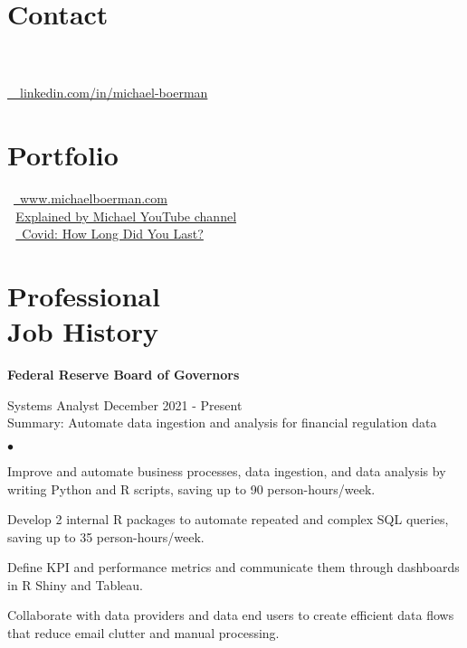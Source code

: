 \documentclass[margin, line]{res}
\newenvironment{list2}{
  \begin{list}{$\bullet$}{%
      \setlength{\itemsep}{0.04in}
      \setlength{\parsep}{0in} \setlength{\parskip}{0in}
      \setlength{\topsep}{0.05in} \setlength{\partopsep}{0in} 
      \setlength{\leftmargin}{\dimexpr 26pt-0.05in}}}
    {\end{list}}
\begin{document}

\begin{resume}

\vspace{-1mm}
\section{\sc Contact }

 \\
 \\
\faLinkedinIn  \href{https://www.linkedin.com/in/michael-boerman}{\ttfamily \, \, linkedin.com/in/michael-boerman}\\
\vspace{-.65cm}


\section{\sc Portfolio }
\faBriefcase \, \href{https://www.michaelboerman.com/}{\ttfamily  \, www.michaelboerman.com}\\
 \,\, \href{https://www.youtube.com/channel/UCxFMrMb6PrS7SOrQi-BfMUw/videos?view=0&sort=p&flow=grid}{ Explained by Michael YouTube channel}\\
\faChartLine \,\, \href{https://michaelboerman.shinyapps.io/covid_percentiles/}{\, Covid: How Long Did You Last?}\\
\vspace{-.35cm}


\section{\sc Professional \\ Job History }
{\bf Federal Reserve Board of Governors}\\

\vspace{-.65cm}

Systems Analyst \hfill December 2021 - Present\\
\hspace*{3mm} 
    Summary: Automate data ingestion and analysis for financial regulation data
\hspace*{3mm}
    \begin{list2}
        \item Improve and automate business processes, data ingestion, and data analysis by writing Python and R scripts, saving up to 90 person-hours/week.
        \item Develop 2 internal R packages to automate repeated and complex SQL queries, saving up to 35 person-hours/week.
        \item Define KPI and performance metrics and communicate them through dashboards in R Shiny and Tableau.
        \item Collaborate with data providers and data end users to create efficient data flows that reduce email clutter and manual processing.
    \end{list2}



\end{resume}
\end{document}
